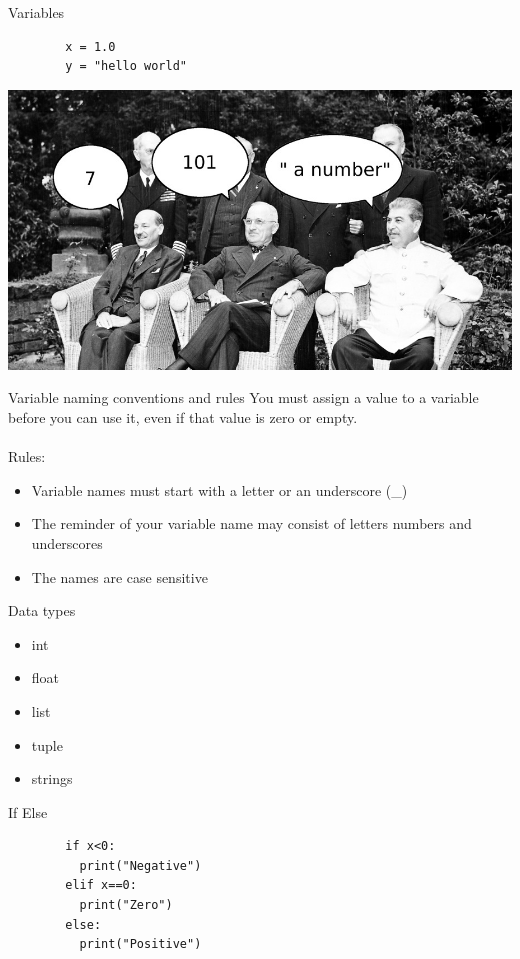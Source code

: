 \documentclass{beamer}
\begin{document}
\begin{frame}[fragile]{Variables}
	\begin{verbatim}
		x = 1.0
		y = "hello world"
	\end{verbatim}
	\begin{center}
		\includegraphics[width=.7\textwidth]{./img/variables.jpg}
	\end{center}
\end{frame}

\begin{frame}{Variable naming conventions and rules}
	You must assign a value to a variable before you can use it, 
	even if that value is zero or empty.
	\\
	\\
	{\Large Rules:}
	\begin{itemize}
		\item Variable names must start with a letter or an underscore (\_)
		\item The reminder of your variable name may consist of letters
			numbers and underscores
		\item The names are case sensitive
	\end{itemize}
\end{frame}

\begin{frame}{Data types}
	\begin{itemize}
		\item int
		\item float
		\item list
		\item tuple
		\item strings
	\end{itemize}
\end{frame}

\begin{frame}[fragile]{If Else}
	\begin{verbatim}
		if x<0:
	 	  print("Negative")
		elif x==0:
		  print("Zero")
		else:
		  print("Positive")
	\end{verbatim}
\end{frame}
\end{document}
